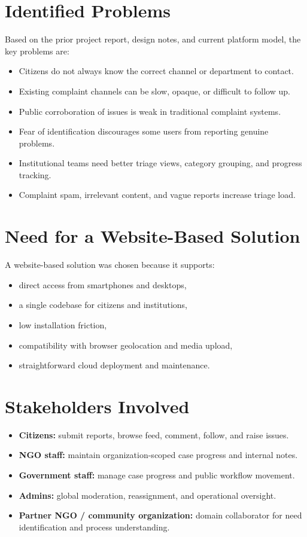 \documentclass[12pt,a4paper]{report}
\begin{document}
\section{Identified Problems}
Based on the prior project report, design notes, and current platform model, the key problems are:
\begin{itemize}
  \item Citizens do not always know the correct channel or department to contact.
  \item Existing complaint channels can be slow, opaque, or difficult to follow up.
  \item Public corroboration of issues is weak in traditional complaint systems.
  \item Fear of identification discourages some users from reporting genuine problems.
  \item Institutional teams need better triage views, category grouping, and progress tracking.
  \item Complaint spam, irrelevant content, and vague reports increase triage load.
\end{itemize}

\section{Need for a Website-Based Solution}
A website-based solution was chosen because it supports:
\begin{itemize}
  \item direct access from smartphones and desktops,
  \item a single codebase for citizens and institutions,
  \item low installation friction,
  \item compatibility with browser geolocation and media upload,
  \item straightforward cloud deployment and maintenance.
\end{itemize}

\section{Stakeholders Involved}
\begin{itemize}
  \item \textbf{Citizens:} submit reports, browse feed, comment, follow, and raise issues.
  \item \textbf{NGO staff:} maintain organization-scoped case progress and internal notes.
  \item \textbf{Government staff:} manage case progress and public workflow movement.
  \item \textbf{Admins:} global moderation, reassignment, and operational oversight.
  \item \textbf{Partner NGO / community organization:} domain collaborator for need identification and process understanding.
\end{itemize}
\end{document}
